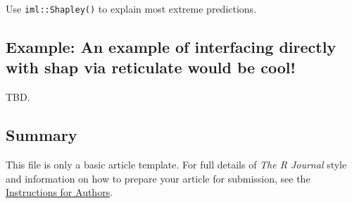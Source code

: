 Use \texttt{iml::Shapley()} to explain most extreme predictions.

\hypertarget{example-an-example-of-interfacing-directly-with-shap-via-reticulate-would-be-cool}{%
\subsection{Example: An example of interfacing directly with shap via
reticulate would be
cool!}\label{example-an-example-of-interfacing-directly-with-shap-via-reticulate-would-be-cool}}

TBD.

\hypertarget{summary}{%
\subsection{Summary}\label{summary}}

This file is only a basic article template. For full details of
\emph{The R Journal} style and information on how to prepare your
article for submission, see the
\href{https://journal.r-project.org/share/author-guide.pdf}{Instructions
for Authors}.




\address{%
Brandon M. Greenwell\\
University of Cincinnati\\%
2925 Campus Green Dr\\ Cincinnati, OH 45221\\ United States of
America\\ ORCiD---\href{https://orcid.org/0000-0002-8120-0084}{0000-0002-8120-0084}\\
%
%
%
\\\href{mailto:greenwell.brandon@gmail.com}{\nolinkurl{greenwell.brandon@gmail.com}}
}
